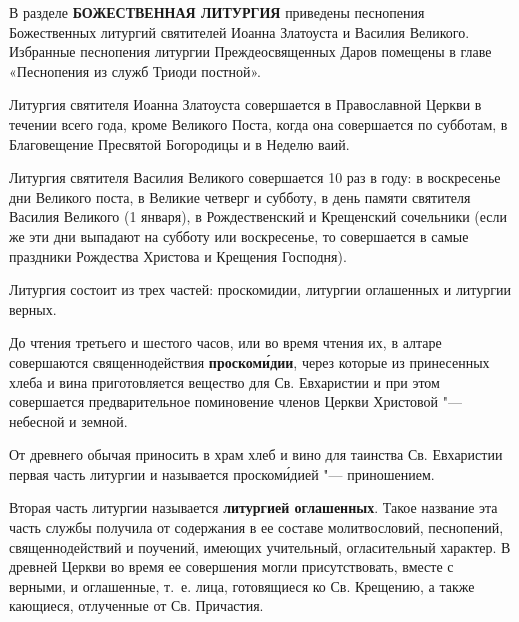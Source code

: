 

\label{_content_Liturgiya}


В разделе \textbf{БОЖЕСТВЕННАЯ ЛИТУРГИЯ} приведены песнопения Божественных литургий святителей Иоанна Златоуста и Василия Великого. Избранные песнопения литургии Преждеосвященных Даров помещены в главе «Песнопения из служб Триоди постной».

Литургия святителя Иоанна Златоуста совершается в Православной Церкви в течении всего года, кроме Великого Поста, когда она совершается по субботам, в Благовещение Пресвятой Богородицы и в Неделю ваий.

Литургия святителя Василия Великого совершается 10 раз в году: в воскресенье дни Великого поста, в Великие четверг и субботу, в день памяти святителя Василия Великого (1 января), в Рождественский и Крещенский сочельники (если же эти дни выпадают на субботу или воскресенье, то совершается в самые праздники Рождества Христова и Крещения Господня).

Литургия состоит из трех частей: проскомидии, литургии оглашенных и литургии верных.


До чтения третьего и шестого часов, или во время чтения их, в алтаре совершаются священнодействия \textbf{проском\'{и}дии}, через которые из принесенных хлеба и вина приготовляется вещество для Св. Евхаристии и при этом совершается предварительное поминовение членов Церкви Христовой "--- небесной и земной.

От древнего обычая приносить в храм хлеб и вино для таинства Св. Евхаристии первая часть литургии и называется проском\'{и}дией "--- приношением.

\mychapterending


Вторая часть литургии называется \textbf{литургией оглашенных}. Такое название эта часть службы получила от содержания в ее составе молитвословий, песнопений, священнодействий и поучений, имеющих учительный, огласительный характер. В древней Церкви во время ее совершения могли присутствовать, вместе с верными, и оглашенные, т.~е. лица, готовящиеся ко Св. Крещению, а также кающиеся, отлученные от Св. Причастия.

